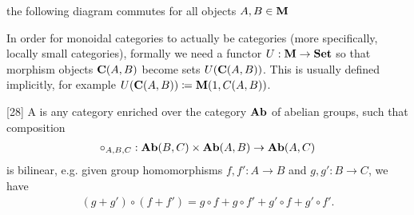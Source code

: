\begin{definition}
\begin{defenum}
    \item the following diagram commutes for all objects \( A, B \in \operatorname{\mathbf{M}} \)

    \begin{Center}
    \end{Center}
  \end{defenum}

  In order for monoidal categories to actually be categories (more specifically, locally small categories), formally we need a functor \( U: \operatorname{\mathbf{M}} \to \operatorname{\mathbf{Set}} \) so that morphism objects \( \operatorname{\mathbf{C}}(A, B) \) become sets \( U(\operatorname{\mathbf{C}}(A, B)) \). This is usually defined implicitly, for example \( U(\operatorname{\mathbf{C}}(A, B)) \coloneqq \operatorname{\mathbf{M}}(1, C(A, B)) \).
\end{definition}

\begin{definition}\label{def:preadditive_category}\cite{MacLane1994}[28]
  A  is any category enriched over the category \( \operatorname{\mathbf{Ab}} \) of abelian groups, such that composition
  \begin{align*}
    \circ_{A,B,C}: \operatorname{\mathbf{Ab}}(B, C) \times \operatorname{\mathbf{Ab}}(A, B) \to \operatorname{\mathbf{Ab}}(A, C)
  \end{align*}
  is bilinear, e.g. given group homomorphisms \( f, f': A \to B \) and \( g, g': B \to C \), we have
  \begin{align*}
    (g + g') \circ (f + f') = g \circ f + g \circ f' + g' \circ f + g' \circ f'.
  \end{align*}
\end{definition}


